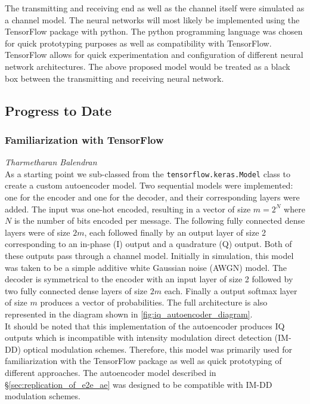         The transmitting and receiving end as well as the channel itself were simulated as a channel model. The neural networks will most likely be implemented using the TensorFlow package with python. The python programming language was chosen for quick prototyping purposes as well as compatibility with TensorFlow. TensorFlow allows for quick experimentation and configuration of different neural network architectures. The above proposed model would be treated as a black box between the transmitting and receiving neural network. 
    
\subsection{Progress to Date}
\label{sec:progress_to_date}

    \subsubsection{Familiarization with TensorFlow}
    \label{sec:familiarization_tensorflow}
    \hspace*{0pt}\hfill \textit{Tharmetharan Balendran}\\
    
        As a starting point we sub-classed from the \texttt{tensorflow.keras.Model} class to create a custom autoencoder model. Two sequential models were implemented: one for the encoder and one for the decoder, and their corresponding layers were added. The input was one-hot encoded, resulting in a vector of size $m=2^N$ where $N$ is the number of bits encoded per message. The following fully connected dense layers were of size $2m$, each followed finally by an output layer of size 2 corresponding to an in-phase (I) output and a quadrature (Q) output. Both of these outputs pass through a channel model. Initially in simulation, this model was taken to be a simple additive white Gaussian noise (AWGN) model. The decoder is symmetrical to the encoder with an input layer of size 2 followed by two fully connected dense layers of size $2m$ each. Finally a output softmax layer of size $m$ produces a vector of probabilities. The full architecture is also represented in the diagram shown in \autoref{fig:iq_autoencoder_diagram}.
        \\
        
        It should be noted that this implementation of the autoencoder produces IQ outputs which is incompatible with intensity modulation direct detection (IM-DD) optical modulation schemes. Therefore, this model was primarily used for familiarization with the TensorFlow package as well as quick prototyping of different approaches. The autoencoder model described in \S \ref{sec:replication_of_e2e_ae} was designed to be compatible with IM-DD modulation schemes.
    
